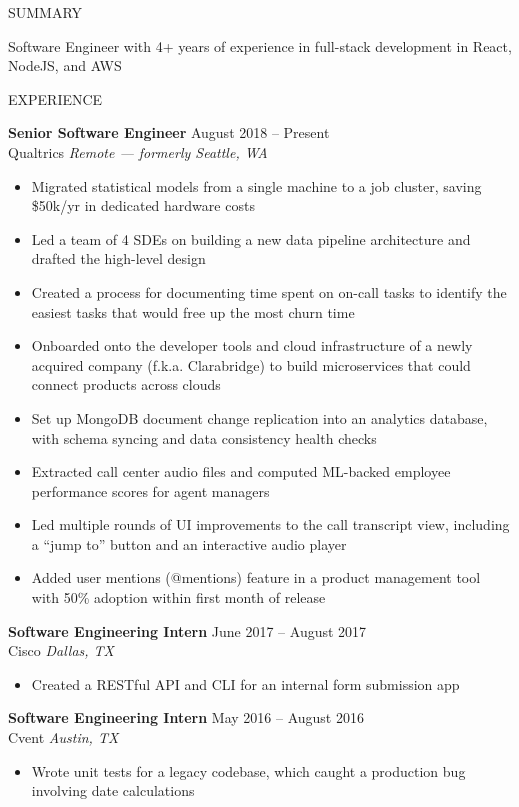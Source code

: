 \documentclass{resume} %
\begin{document}
\begin{rSection}{SUMMARY}

	{Software Engineer with 4+ years of experience in full-stack development in React, NodeJS, and AWS}

\end{rSection}


\begin{rSection}{EXPERIENCE}

	\textbf{Senior Software Engineer} \hfill August 2018 -- Present\\
	Qualtrics \hfill \textit{Remote --- formerly Seattle, WA}
	\begin{itemize}
		\itemsep -3pt {}
		\item Migrated statistical models from a single machine to a job cluster, saving \$50k/yr in dedicated hardware costs
		\item Led a team of 4 SDEs on building a new data pipeline architecture and drafted the high-level design
		\item Created a process for documenting time spent on on-call tasks to identify the easiest tasks that would free up the most churn time
		\item Onboarded onto the developer tools and cloud infrastructure of a newly acquired company (f.k.a. Clarabridge) to build microservices that could connect products across clouds
		\item Set up MongoDB document change replication into an analytics database, with schema syncing and data consistency health checks
		\item Extracted call center audio files and computed ML-backed employee performance scores for agent managers
		\item Led multiple rounds of UI improvements to the call transcript view, including a “jump to” button and an interactive audio player
		\item Added user mentions (@mentions) feature in a product management tool with 50\% adoption within first month of release
	\end{itemize}

	\textbf{Software Engineering Intern} \hfill June 2017 -- August 2017\\
	Cisco \hfill \textit{Dallas, TX}
	\begin{itemize}
		\item Created a RESTful API and CLI for an internal form submission app
	\end{itemize}

	\textbf{Software Engineering Intern} \hfill May 2016 -- August 2016\\
	Cvent \hfill \textit{Austin, TX}
	\begin{itemize}
		\item Wrote unit tests for a legacy codebase, which caught a production bug involving date calculations
	\end{itemize}

\end{rSection}
\end{document}
